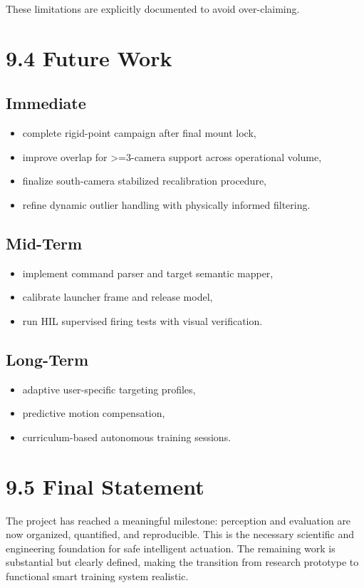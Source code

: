 These limitations are explicitly documented to avoid over-claiming.

\section{9.4 Future Work}
\subsection{Immediate}
\begin{itemize}
  \item complete rigid-point campaign after final mount lock,
  \item improve overlap for >=3-camera support across operational volume,
  \item finalize south-camera stabilized recalibration procedure,
  \item refine dynamic outlier handling with physically informed filtering.
\end{itemize}

\subsection{Mid-Term}
\begin{itemize}
  \item implement command parser and target semantic mapper,
  \item calibrate launcher frame and release model,
  \item run HIL supervised firing tests with visual verification.
\end{itemize}

\subsection{Long-Term}
\begin{itemize}
  \item adaptive user-specific targeting profiles,
  \item predictive motion compensation,
  \item curriculum-based autonomous training sessions.
\end{itemize}

\section{9.5 Final Statement}
The project has reached a meaningful milestone: perception and evaluation are now organized, quantified, and reproducible. This is the necessary scientific and engineering foundation for safe intelligent actuation. The remaining work is substantial but clearly defined, making the transition from research prototype to functional smart training system realistic.


